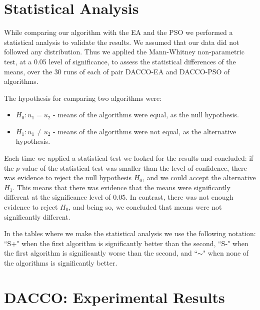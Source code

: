 \section{Statistical Analysis}
\label{sec:statistical_analysis}
While comparing our algorithm with the EA and the PSO we performed a statistical analysis to validate the results. We assumed that our data did not followed any distribution. Thus we applied the Mann-Whitney non-parametric test, at a 0.05 level of significance, to assess the statistical differences of the means, over the 30 runs of each of pair DACCO-EA and DACCO-PSO of algorithms.

The hypothesis for comparing two algorithms were:
\begin{itemize}
	\item $H_{0} : u_1 = u_2$ - means of the algorithms were equal, as the null hypothesis.
	\item $H_{1} : u_1 \neq u_2$ - means of the algorithms were not equal, as the alternative hypothesis.
\end{itemize}

Each time we applied a statistical test we looked for the results and concluded: if the $p$-value of the statistical test was smaller than the level of confidence, there was evidence to reject the null hypothesis $H_{0}$, and we could accept the alternative $H_{1}$. This means that there was evidence that the means were significantly different  at the significance level of 0.05. In contrast, there was not enough evidence to reject $H_{0}$, and being so, we concluded that means were not significantly different.

In the tables where we make the statistical analysis we use the following notation: ``S+" when the first algorithm is significantly better than the second, ``S-" when the first algorithm is significantly worse than the second, and ``$\sim$" when none of the algorithms is significantly better.



\section{DACCO: Experimental Results}
\label{sec:experimental_results}
	
